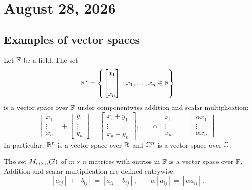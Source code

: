\section{August 28, 2026}

\subsection{Examples of vector spaces}

\begin{example}
  Let $\mathbb{F}$ be a field. The set
  \[
    \mathbb{F}^n
    =\left\{
      \begin{bmatrix}
        x_1\\ \vdots\\ x_n
      \end{bmatrix}
      :x_1,\ldots,x_n\in\mathbb{F}
    \right\}
  \]
  is a vector space over $\mathbb{F}$ under componentwise addition and scalar
  multiplication:
  \[
    \begin{bmatrix}x_1\\ \vdots\\ x_n\end{bmatrix}
    +\begin{bmatrix}y_1\\ \vdots\\ y_n\end{bmatrix}
    =\begin{bmatrix}x_1+y_1\\ \vdots\\ x_n+y_n\end{bmatrix},
    \qquad
    \alpha\begin{bmatrix}x_1\\ \vdots\\ x_n\end{bmatrix}
    =\begin{bmatrix}\alpha x_1\\ \vdots\\ \alpha x_n\end{bmatrix}.
  \]
  In particular, $\mathbb{R}^n$ is a vector space over $\mathbb{R}$ and
  $\mathbb{C}^n$ is a vector space over $\mathbb{C}$.
\end{example}

\begin{example}
  The set $M_{m\times n}(\mathbb{F})$ of $m\times n$ matrices with entries in
  $\mathbb{F}$ is a vector space over $\mathbb{F}$. Addition and scalar
  multiplication are defined entrywise:
  \[
    [a_{ij}]+[b_{ij}]=[a_{ij}+b_{ij}],
    \qquad
    \alpha[a_{ij}]=[\alpha a_{ij}].
  \]
\end{example}

